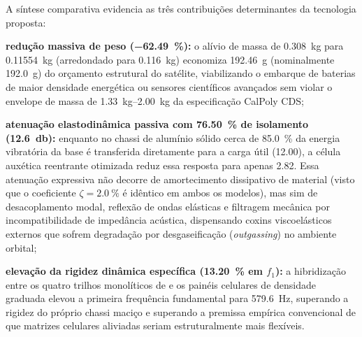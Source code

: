 \begin{table}[htb]
\begin{tabularx}{\textwidth}{@{}>{\raggedright\arraybackslash}p{3.0cm} >{\centering\arraybackslash}p{2.0cm} >{\centering\arraybackslash}p{2.0cm} >{\centering\arraybackslash}p{2.2cm} >{\raggedright\arraybackslash}X@{}}
    \bottomrule
  \end{tabularx}
\end{table}

A síntese comparativa evidencia as três contribuições determinantes da tecnologia proposta:
\begin{alineas}
  \item \textbf{redução massiva de peso (\SI{-62.49}{\percent}):} o alívio de massa de \SI{0.308}{\kilo\gram} para \SI{0.11554}{\kilo\gram} (arredondado para \SI{0.116}{\kilo\gram}) economiza \SI{192.46}{\gram} (nominalmente \SI{192.0}{\gram}) do orçamento estrutural do satélite, viabilizando o embarque de baterias de maior densidade energética ou sensores científicos avançados sem violar o envelope de massa de \SIrange{1.33}{2.00}{\kilo\gram} da especificação CalPoly CDS;
  \item \textbf{atenuação elastodinâmica passiva com \SI{76.50}{\percent} de isolamento (\SI{12.6}{\decibel}):} enquanto no chassi de alumínio sólido cerca de \SI{85.0}{\percent} da energia vibratória da base é transferida diretamente para a carga útil (\SI{12.00}{\Grms}), a célula auxética reentrante otimizada reduz essa resposta para apenas \SI{2.82}{\Grms}. Essa atenuação expressiva não decorre de amortecimento dissipativo de material (visto que o coeficiente $\zeta = \SI{2.0}{\percent}$ é idêntico em ambos os modelos), mas sim de desacoplamento modal, reflexão de ondas elásticas e filtragem mecânica por incompatibilidade de impedância acústica, dispensando coxins viscoelásticos externos que sofrem degradação por desgaseificação (\textit{outgassing}) no ambiente orbital;
  \item \textbf{elevação da rigidez dinâmica específica (\SI{+13.20}{\percent} em $f_1$):} a hibridização entre os quatro trilhos monolíticos de \rail{} e os painéis celulares de densidade graduada elevou a primeira frequência fundamental para \SI{579.6}{\hertz}, superando a rigidez do próprio chassi maciço e superando a premissa empírica convencional de que matrizes celulares aliviadas seriam estruturalmente mais flexíveis.
\end{alineas}

